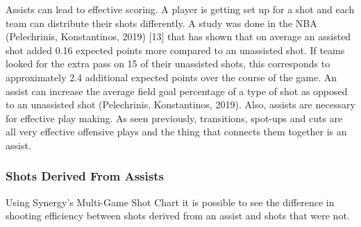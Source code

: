 \documentclass[]{book}
\begin{document}
Assists can lead to effective scoring. A player is getting set up for a shot and each team can distribute their shots differently. A study was done in the NBA (Pelechrinis, Konstantinos, 2019) {[}13{]} that has shown that on average an assisted shot added 0.16 expected points more compared to an unassisted shot. If teams looked for the extra pass on 15 of their unassisted shots, this corresponds to approximately 2.4 additional expected points over the course of the game. An assist can increase the average field goal percentage of a type of shot as opposed to an unassisted shot (Pelechrinis, Konstantinos, 2019). Also, assists are necessary for effective play making. As seen previously, transitions, spot-ups and cuts are all very effective offensive plays and the thing that connects them together is an assist.

\hypertarget{shots-derived-from-assists}{%
\subsubsection{Shots Derived From Assists}\label{shots-derived-from-assists}}

Using Synergy's Multi-Game Shot Chart it is possible to see the difference in shooting efficiency between shots derived from an assist and shots that were not.
\end{document}
